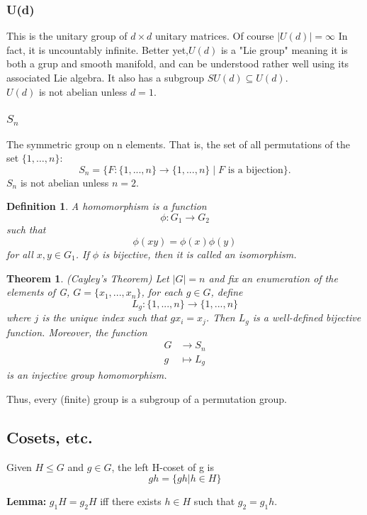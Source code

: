 \documentclass{article}
\newtheorem{thm}{Theorem}
\newtheorem*{dfn}{Definition}
\begin{document}
\subsubsection{U(d)}
This is the unitary group of $d \times d$ unitary matrices.  Of course $|U(d)| = \infty$ In fact, it is uncountably infinite. Better yet,$U(d)$ is a "Lie group" meaning it is both a grup and smooth manifold, and can be understood rather well using its associated Lie algebra. It also has a subgroup $SU(d) \subseteq U(d)$. \\

$U(d)$ is not abelian unless $d=1$.

\subsubsection{$S_{n}$}
The symmetric group on n elements.  That is, the set of all permutations of the set $\{1,\dots,n\}$:
$$S_{n} = \{F:\{1,...,n\} \to \{1,...,n\} \mid F \text{ is a bijection}\} .$$
$S_{n}$ is not abelian unless $n=2$.

\begin{dfn}
    A \emph{homomorphism} is a function 
    $$\phi:G_{1} \to G_{2}$$
    such that
    $$\phi (xy) = \phi(x)\phi(y)$$
    for all $x, y \in G_1$. If $\phi$ is bijective, then it is called an \emph{isomorphism}.
\end{dfn}

\begin{thm}{(Cayley's Theorem)}
   Let $|G| = n$ and fix an enumeration of the elements of G, $G = \{x_{1},...,x_{n}\}$, for each $g \in G$, define 
   $$L_{g}:\{1,...,n\} \to \{1,...,n\}$$
   where $j$ is the unique index such that $gx_{i} = x_{j}$.  Then $L_{g}$ is a well-defined bijective function. Moreover, the function
\[\begin{aligned}
G &\to S_{n} \\
g &\mapsto L_{g}
\end{aligned}\]
    is an injective group homomorphism.
\end{thm}
Thus, every (finite) group is a subgroup of a permutation group.

\subsection{Cosets, etc.}
Given $H\leq G$ and  $g \in G$, the left H-coset of g is 
$$gh = \{gh|h\in H\}$$

\textbf{Lemma:} $g_{1}H = g_{2}H$ iff there exists $h\in H$ such that $g_{2}=g_{1}h$. \\
\end{document}
